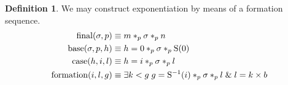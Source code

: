 \documentclass{amsbook}
\newcommand{\exis}[1]{\mathord\exists#1\;}
\newcommand{\conj}{\mathrel\&}
\theoremstyle{definition}
\newtheorem{dfn}{Definition}[section]
\begin{document}
\begin{dfn}
    We may construct exponentiation by means of a formation sequence.
    \begin{align*}
        \mathrm{final}(\sigma, p)     \equiv\;          & m *_p \sigma *_p n                                                  \\
        \mathrm{base}(\sigma, p, h)            \equiv\; & h = 0 *_p \sigma *_p \suc(0)                                        \\
        \mathrm{case}(h, i, l)\equiv\;                  & h = i *_p \sigma *_p l                                              \\
        \mathrm{formation}(i, l, g) \equiv\;            & \exis{k < g} g = \suc^{-1}(i) *_p \sigma *_p l \conj l = k \times b
    \end{align*}
\end{dfn}
\end{document}
